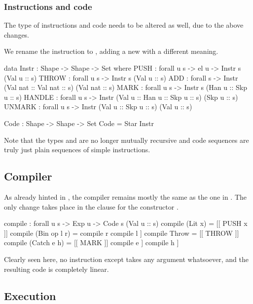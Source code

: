 \subsubsection{Instructions and code}

The type of instructions and code needs to be altered as well, due to the above
changes.

We rename the instruction  to , adding a new
 with a different meaning.

\begin{code}
  data Instr : Shape -> Shape -> Set where
    PUSH : forall {u s} -> el u -> Instr s (Val u :: s)
    THROW : forall {u s} -> Instr s (Val u :: s)
    ADD : forall {s} -> Instr (Val nat :: Val nat :: s) (Val nat :: s)
    MARK : forall {u s} -> Instr s (Han u :: Skp u :: s)
    HANDLE : forall {u s} -> Instr (Val u :: Han u :: Skp u :: s) (Skp u :: s)
    UNMARK : forall {u s} -> Instr (Val u :: Skp u :: s) (Val u :: s)
\end{code}\label{sec:lin-code}
\begin{code}
  Code : Shape -> Shape -> Set
  Code = Star Instr
\end{code}
\noindent Note that the types  and  are no longer mutually recursive
and code sequences are truly just plain sequences of simple instructions.

\subsection{Compiler}

As already hinted in , the compiler remains
mostly the same as the one in . The only change takes
place in the clause for the constructor .

\label{sec:lin-compile}\begin{code}
  compile : forall {u s} -> Exp u -> Code s (Val u :: s)
  compile (Lit x) = [[ PUSH x ]]
  compile (Bin op l r) = compile r \app compile l \app [[ opInstr op ]] 
  compile Throw = [[ THROW ]]
  compile (Catch e h) =
      [[ MARK ]] \app compile e \app [[ HANDLE ]] \app compile h \app [[ UNMARK ]]
\end{code}

Clearly seen here, no instruction except  takes any argument whatsoever,
and the resulting code is completely linear.

\subsection{Execution}

